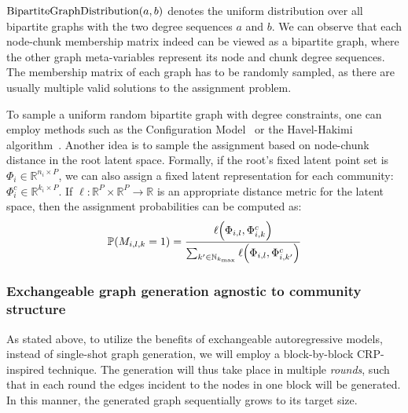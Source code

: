 $\text{BipartiteGraphDistribution}\mathopen{}\left(a,b\right)$ denotes the uniform distribution over all bipartite graphs with the two degree sequences $a$ and $b$. We can observe that each node-chunk membership matrix indeed can be viewed as a bipartite graph, where the other graph meta-variables represent its node and chunk degree sequences. The membership matrix of each graph has to be randomly sampled, as there are usually multiple valid solutions to the assignment problem. 
    
To sample a uniform random bipartite graph with degree constraints, one can employ methods such as the Configuration Model~\cite{newman_structure_2003} or the Havel-Hakimi algorithm~\cite{hakimi_realizability_1963, kleitman_algorithms_1973}. Another idea is to sample the assignment based on node-chunk distance in the root latent space. Formally, if the root's fixed latent point set is $\Phi_i \in \mathbb{R}^{n_i \times P}$, we can also assign a fixed latent representation for each community: $\Phi^c_i \in \mathbb{R}^{k_i \times P}$. If $\ell: \mathbb{R}^{P} \times \mathbb{R}^{P} \to \mathbb{R}$ is an appropriate distance metric for the latent space, then the assignment probabilities can be computed as: 
\begin{equation}
\mathbb{P}\mathopen{}\left(M_{i,l,k}=1\right)=\frac{\ell\mathopen{}\left(\Phi_{i,l},\Phi^c_{i,k}\right)}{\sum_{k' \in \mathbb{N}_{k_{\max}}}{\ell\mathopen{}\left(\Phi_{i,l},\Phi^c_{i,k'}\right)}}
\end{equation}

\subsubsection{Exchangeable graph generation agnostic to community structure}
As stated above, to utilize the benefits of exchangeable autoregressive models, instead of single-shot graph generation, we will employ a block-by-block CRP-inspired technique. The generation will thus take place in multiple \emph{rounds}, such that in each round the edges incident to the nodes in one block will be generated. In this manner, the generated graph sequentially grows to its target size.

